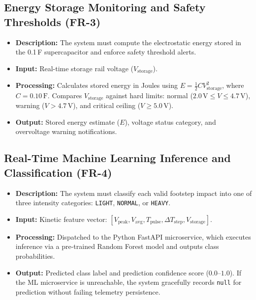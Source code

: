 \subsection{Energy Storage Monitoring and Safety Thresholds (FR-3)}
\begin{itemize}
    \item \textbf{Description:} The system must compute the electrostatic energy stored in the 0.1\,F supercapacitor and enforce safety threshold alerts.
    \item \textbf{Input:} Real-time storage rail voltage ($V_{\text{storage}}$).
    \item \textbf{Processing:} Calculates stored energy in Joules using $E = \frac{1}{2} C V_{\text{storage}}^2$, where $C = 0.10\,\text{F}$. Compares $V_{\text{storage}}$ against hard limits: normal ($2.0\,\text{V} \le V \le 4.7\,\text{V}$), warning ($V > 4.7\,\text{V}$), and critical ceiling ($V \ge 5.0\,\text{V}$).
    \item \textbf{Output:} Stored energy estimate ($E$), voltage status category, and overvoltage warning notifications.
\end{itemize}

\subsection{Real-Time Machine Learning Inference and Classification (FR-4)}
\begin{itemize}
    \item \textbf{Description:} The system must classify each valid footstep impact into one of three intensity categories: \texttt{LIGHT}, \texttt{NORMAL}, or \texttt{HEAVY}.
    \item \textbf{Input:} Kinetic feature vector: $[V_{\text{peak}}, V_{\text{avg}}, T_{\text{pulse}}, \Delta T_{\text{step}}, V_{\text{storage}}]$.
    \item \textbf{Processing:} Dispatched to the Python FastAPI microservice, which executes inference via a pre-trained Random Forest model and outputs class probabilities.
    \item \textbf{Output:} Predicted class label and prediction confidence score ($0.0\text{--}1.0$). If the ML microservice is unreachable, the system gracefully records \texttt{null} for prediction without failing telemetry persistence.
\end{itemize}

